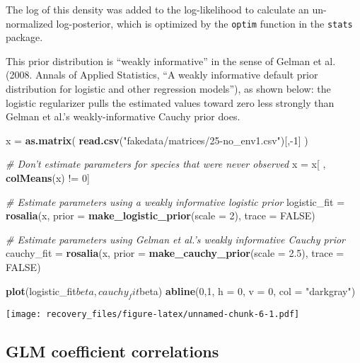 \documentclass[11pt,]{article}
\newenvironment{Shaded}{\begin{snugshade}}{\end{snugshade}}
\newcommand{\KeywordTok}[1]{\textcolor[rgb]{0.13,0.29,0.53}{\textbf{{#1}}}}
\newcommand{\DataTypeTok}[1]{\textcolor[rgb]{0.13,0.29,0.53}{{#1}}}
\newcommand{\DecValTok}[1]{\textcolor[rgb]{0.00,0.00,0.81}{{#1}}}
\newcommand{\FloatTok}[1]{\textcolor[rgb]{0.00,0.00,0.81}{{#1}}}
\newcommand{\StringTok}[1]{\textcolor[rgb]{0.31,0.60,0.02}{{#1}}}
\newcommand{\CommentTok}[1]{\textcolor[rgb]{0.56,0.35,0.01}{\textit{{#1}}}}
\newcommand{\OtherTok}[1]{\textcolor[rgb]{0.56,0.35,0.01}{{#1}}}
\newcommand{\NormalTok}[1]{{#1}}
\begin{document}
The log of this density was added to the log-likelihood to calculate an
un-normalized log-posterior, which is optimized by the \texttt{optim}
function in the \texttt{stats} package.

This prior distribution is ``weakly informative'' in the sense of Gelman
et al. (2008. Annals of Applied Statistics, ``A weakly informative
default prior distribution for logistic and other regression models''),
as shown below: the logistic regularizer pulls the estimated values
toward zero less strongly than Gelman et al.'s weakly-informative Cauchy
prior does.

\begin{Shaded}
\begin{Highlighting}[]
\NormalTok{x =}\StringTok{ }\KeywordTok{as.matrix}\NormalTok{(}
  \KeywordTok{read.csv}\NormalTok{(}\StringTok{"fakedata/matrices/25-no_env1.csv"}\NormalTok{)[,-}\DecValTok{1}\NormalTok{]}
\NormalTok{)}

\CommentTok{# Don't estimate parameters for species that were never observed}
\NormalTok{x =}\StringTok{ }\NormalTok{x[ , }\KeywordTok{colMeans}\NormalTok{(x) !=}\StringTok{ }\DecValTok{0}\NormalTok{]}


\CommentTok{# Estimate parameters using a weakly informative logistic prior}
\NormalTok{logistic_fit =}\StringTok{ }\KeywordTok{rosalia}\NormalTok{(x, }\DataTypeTok{prior =} \KeywordTok{make_logistic_prior}\NormalTok{(}\DataTypeTok{scale =} \DecValTok{2}\NormalTok{),}
                             \DataTypeTok{trace =} \OtherTok{FALSE}\NormalTok{)}

\CommentTok{# Estimate parameters using Gelman et al.'s weakly informative Cauchy prior}
\NormalTok{cauchy_fit =}\StringTok{ }\KeywordTok{rosalia}\NormalTok{(x, }\DataTypeTok{prior =} \KeywordTok{make_cauchy_prior}\NormalTok{(}\DataTypeTok{scale =} \FloatTok{2.5}\NormalTok{),}
                           \DataTypeTok{trace =} \OtherTok{FALSE}\NormalTok{)}


\KeywordTok{plot}\NormalTok{(logistic_fit$beta, cauchy_fit$beta)}
\KeywordTok{abline}\NormalTok{(}\DecValTok{0}\NormalTok{,}\DecValTok{1}\NormalTok{, }\DataTypeTok{h =} \DecValTok{0}\NormalTok{, }\DataTypeTok{v =} \DecValTok{0}\NormalTok{, }\DataTypeTok{col =} \StringTok{"darkgray"}\NormalTok{)}
\end{Highlighting}
\end{Shaded}

\texttt{[image: recovery\_files/figure-latex/unnamed-chunk-6-1.pdf]}

\subsection{GLM coefficient
correlations}\label{glm-coefficient-correlations}
\end{document}
